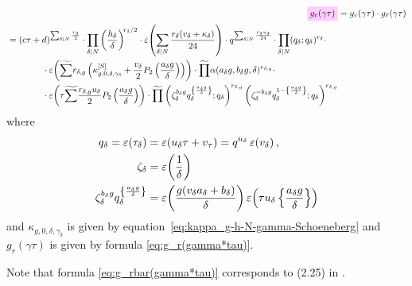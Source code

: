 \documentclass{article}
\begin{document}
\begin{align}
  \defineNotation[g-rbar-gamma-tau]{g_{\bar{r}}(\gamma\tau)}
  &=
    g_r(\gamma\tau) \cdot g_{\tilde{r}}(\gamma\tau)
  \notag\\
  \begin{split}
  &=
  (c \tau+d)^{\divisorsum{N} \frac{r_\delta}{2}}
  \cdot
  \divisorprod{N}
  \left(\frac{h_\delta}{\delta}\right)^{\!r_\delta/2}
  \cdot
  \unityPower{\divisorsum{N} \frac{r_\delta(v_\delta + \kappa_\delta)}{24}}
  \cdot
  q^{\divisorsum{N} \frac{r_\delta u_\delta}{24}}
  \cdot
  \divisorprod{N} (q_\delta; q_\delta)^{r_\delta}
  \cdot
  \\
  &\qquad\qquad
    \cdot
    \unityPower{
      \widetilde{\sum}
      r_{\delta,g}
      \left(
        \kappa_{g,0,\delta,\gamma_\delta}^{[S]}
      +
      \frac{v_\delta}{2} P_2\left(\frac{a_\delta g}{\delta}\right)
      \right)}
  \cdot
  \widetilde{\prod}
  \alpha(a_\delta g, b_\delta g,\delta)^{r_{\delta,g}}
  \cdot
  \\
  &\qquad\qquad
  \cdot
  \unityPower{\tau
    \widetilde{\sum}
    \frac{r_{\delta,g} u_\delta}{2} P_2\left(\frac{a_\delta g}{\delta}\right)}
  \cdot
  \widetilde{\prod}
  \left(
    \zeta_\delta^{b_\delta g} q_\delta^{\left\{\frac{a_\delta g}{\delta}\right\}}
    ;
    q_\delta
  \right)^{r_{\delta,g}}
  \left(
    \zeta_\delta^{-{b_\delta g}} q_\delta^{1-\left\{\frac{a_\delta g}{\delta}\right\}}
    ;
    q_\delta
  \right)^{r_{\delta,g}}
  \end{split}
  \label{eq:g_rbar(gamma*tau)}
\end{align}
where
\begin{align*}
  q_\delta = \varepsilon\!\left(\tau_\delta\right)
  &=
    \varepsilon\!\left(u_\delta\tau + v_\tau\right) = q^{u_\delta} \, \varepsilon\!\left(v_\delta\right),
  \\
  \zeta_\delta
  &=
    \varepsilon\!\left(\frac{1}{\delta}\right)
  \\
  \zeta_\delta^{b_\delta g} q_\delta^{\left\{\frac{a_\delta g}{\delta}\right\}}
  &=
    \varepsilon\!\left(\frac{g(v_\delta a_\delta + b_\delta)}{\delta}\right)
    \varepsilon\!\left(\tau u_\delta \left\{\frac{a_\delta g}{\delta}\right\}\right)
\end{align*}
and
$\kappa_{g,0,\delta,\gamma_\delta}$ is given by
equation~\eqref{eq:kappa_g-h-N-gamma-Schoeneberg} and
$g_r(\gamma\tau)$ is given by formula
\eqref{eq:g_r(gamma*tau)}.


Note that formula \eqref{eq:g_rbar(gamma*tau)} corresponds to (2.25)
in \cite{Chen+Du+Zhao:FindingModularFunctionsRamanujan:2019}.
\end{document}
